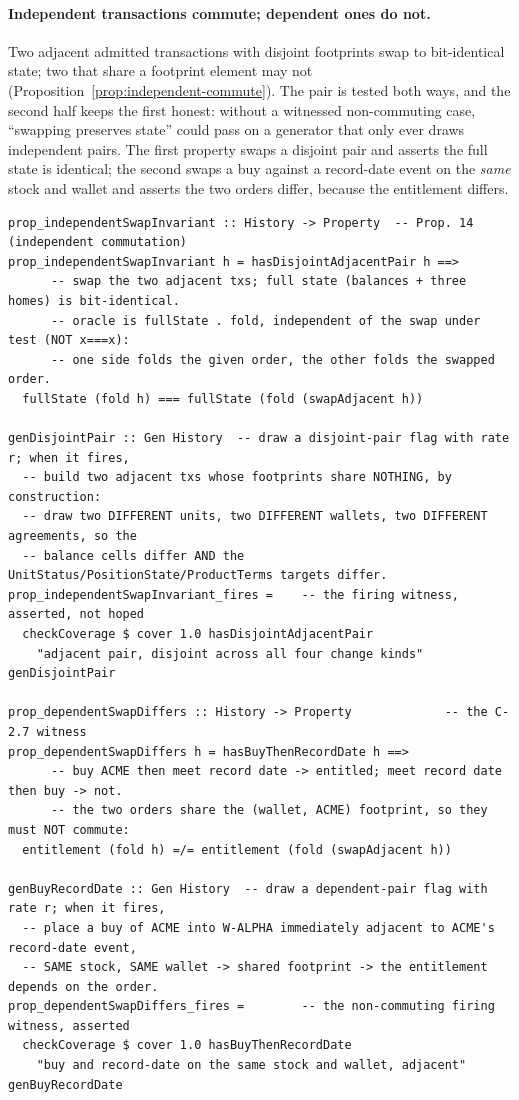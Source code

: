 \paragraph{Independent transactions commute; dependent ones do not.}
Two adjacent admitted transactions with disjoint footprints swap to bit-identical state;
two that share a footprint element may not (Proposition~\ref{prop:independent-commute}).
The pair is tested both ways, and the second half keeps the first honest: without a
witnessed non-commuting case, ``swapping preserves state'' could pass on a generator that
only ever draws independent pairs. The first property swaps a disjoint pair and asserts the
full state is identical; the second swaps a buy against a record-date event on the
\emph{same} stock and wallet and asserts the two orders differ, because the entitlement
differs.

\begin{lstlisting}
prop_independentSwapInvariant :: History -> Property  -- Prop. 14 (independent commutation)
prop_independentSwapInvariant h = hasDisjointAdjacentPair h ==>
      -- swap the two adjacent txs; full state (balances + three homes) is bit-identical.
      -- oracle is fullState . fold, independent of the swap under test (NOT x===x):
      -- one side folds the given order, the other folds the swapped order.
  fullState (fold h) === fullState (fold (swapAdjacent h))

genDisjointPair :: Gen History  -- draw a disjoint-pair flag with rate r; when it fires,
  -- build two adjacent txs whose footprints share NOTHING, by construction:
  -- draw two DIFFERENT units, two DIFFERENT wallets, two DIFFERENT agreements, so the
  -- balance cells differ AND the UnitStatus/PositionState/ProductTerms targets differ.
prop_independentSwapInvariant_fires =    -- the firing witness, asserted, not hoped
  checkCoverage $ cover 1.0 hasDisjointAdjacentPair
    "adjacent pair, disjoint across all four change kinds" genDisjointPair

prop_dependentSwapDiffers :: History -> Property             -- the C-2.7 witness
prop_dependentSwapDiffers h = hasBuyThenRecordDate h ==>
      -- buy ACME then meet record date -> entitled; meet record date then buy -> not.
      -- the two orders share the (wallet, ACME) footprint, so they must NOT commute:
  entitlement (fold h) =/= entitlement (fold (swapAdjacent h))

genBuyRecordDate :: Gen History  -- draw a dependent-pair flag with rate r; when it fires,
  -- place a buy of ACME into W-ALPHA immediately adjacent to ACME's record-date event,
  -- SAME stock, SAME wallet -> shared footprint -> the entitlement depends on the order.
prop_dependentSwapDiffers_fires =        -- the non-commuting firing witness, asserted
  checkCoverage $ cover 1.0 hasBuyThenRecordDate
    "buy and record-date on the same stock and wallet, adjacent" genBuyRecordDate
\end{lstlisting}

